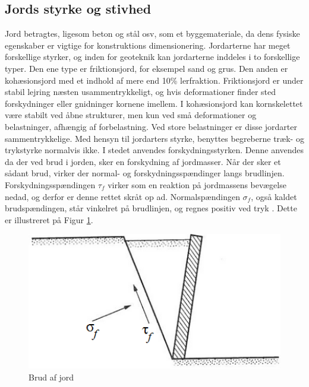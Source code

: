 \subsection{Jords styrke og stivhed}
Jord betragtes, ligesom beton og stål osv, som et byggemateriale, da dens fysiske egenskaber er vigtige for konstruktions dimensionering.\citep{DGF} 
\newline \indent{     }  Jordarterne har meget forskellige styrker, og inden for geoteknik kan jordarterne inddeles i to forskellige typer. Den ene type er friktionsjord, for eksempel sand og grus. Den anden er kohæsionsjord med et indhold af mere end 10\% lerfraktion. 
Friktionsjord er under stabil lejring næsten usammentrykkeligt, og hvis deformationer finder sted forskydninger eller gnidninger kornene imellem.\citep{DGF}
\newline \indent{     }  I kohæsionsjord kan kornskelettet være stabilt ved åbne strukturer, men kun ved små deformationer og belastninger, afhængig af forbelastning. Ved store belastninger er disse jordarter sammentrykkelige.
\newline \indent{     }  Med hensyn til jordarters styrke, benyttes begreberne træk- og trykstyrke normalvis ikke. I stedet anvendes forskydningsstyrken. Denne anvendes da der ved brud i jorden, sker en forskydning af jordmasser. Når der sker et sådant brud, virker der normal- og forskydningsspændinger langs brudlinjen.\citep{geoteknik} Forskydningsspændingen $\tau_f$ virker som en reaktion på jordmassens bevægelse nedad, og derfor er denne rettet skråt op ad. Normalspændingen $\sigma_f$, også kaldet brudspændingen, står vinkelret på brudlinjen, og regnes positiv ved tryk \citep{geoteknik}. Dette er illustreret på Figur \ref{fig:poretrykket}. 

\begin{figure}[htbp] \centering
	\begin{minipage}[b]{0.48\textwidth}\centering
		\includegraphics[width=1.0\textwidth]{billeder/poretrykket.png}
		\caption{Brud af jord \citep{Geoteknik}}
		\label{fig:poretrykket}
	\end{minipage}\hfill
\end{figure}

